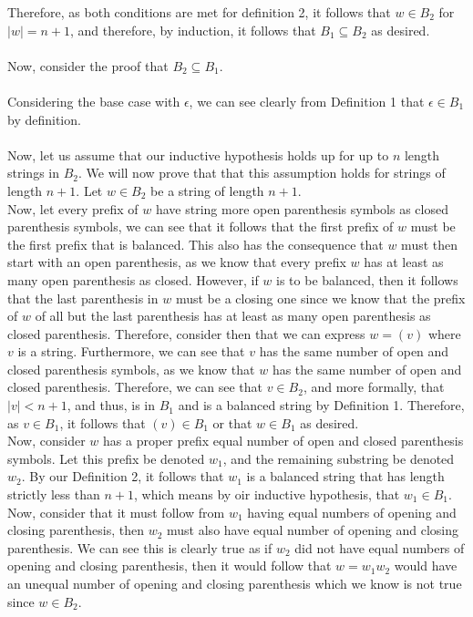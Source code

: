 \documentclass[11pt]{article}
\begin{document}
\begin{enumerate}
	 Therefore, as both conditions are met for definition 2, it follows that $w \in B_2$ for $|w| = n+1$, and therefore, by induction, it follows that $B_1 \subseteq B_2$ as desired.\\\\
	 Now, consider the proof that $B_2 \subseteq B_1$. \\\\
	 Considering the base case with $\epsilon$, we can see clearly from Definition 1 that $\epsilon \in B_1$ by definition. \\\\
	 Now, let us assume that our inductive hypothesis holds up for up to $n$ length strings in $B_2$. We will now prove that that this assumption holds for strings of length $n+1$. Let $w \in B_2$ be a string of length $n+1$. \\
	 Now, let every prefix of $w$ have string more open parenthesis symbols as closed parenthesis symbols, we can see that it follows that the first prefix of $w$ must be the first prefix that is balanced. This also has the consequence that $w$ must then start with an open parenthesis, as we know that every prefix $w$ has at least as many open parenthesis as closed.
	 However, if $w$ is to be balanced, then it follows that the last parenthesis in $w$ must be a closing one since we know that the prefix of $w$ of all but the last parenthesis has at least as many open parenthesis as closed parenthesis. Therefore, consider then that we can express $w = (v)$ where $v$ is a string. Furthermore, we can see that $v$ has the same number of open and closed parenthesis symbols,
	 as we know that $w$ has the same number of open and closed parenthesis. Therefore, we can see that $v \in B_2$, and more formally, that $|v| < n+1$, and thus, is in $B_1$ and is a balanced string by Definition 1. Therefore, as $v \in B_1$, it follows that $(v) \in B_1$ or that $w \in B_1$ as desired.\\
	 Now, consider $w$ has a proper prefix equal number of open and closed parenthesis symbols. Let this prefix be denoted $w_1$, and the remaining substring be denoted $w_2$. By our Definition 2, it follows that $w_1$ is a balanced string that has length strictly less than $n+1$, which means by oir inductive hypothesis, that $w_1 \in B_1$. Now, consider that it must follow from $w_1$ 
	 having equal numbers of opening and closing parenthesis, then $w_2$ must also have equal number of opening and closing parenthesis. We can see this is clearly true as if $w_2$ did not have equal numbers of opening and closing parenthesis, then it would follow that $w = w_1w_2$ would have an unequal number of opening and closing parenthesis which we know is not true since $w \in B_2$.

\end{enumerate}
\end{document}
